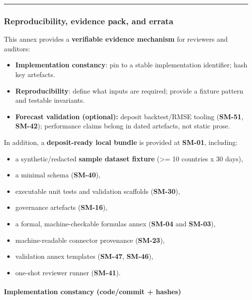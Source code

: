 \documentclass[
  11pt,
  peerreview,journal,onecolumn]{IEEEtran}
\providecommand{\tightlist}{%
  \setlength{\itemsep}{0pt}\setlength{\parskip}{0pt}}
\begin{document}
\begin{center}\rule{0.5\linewidth}{0.5pt}\end{center}

\hypertarget{reproducibility-evidence-pack-and-errata}{%
\subsubsection{Reproducibility, evidence pack, and
errata}\label{reproducibility-evidence-pack-and-errata}}

This annex provides a \textbf{verifiable evidence mechanism} for
reviewers and auditors:

\begin{itemize}
\tightlist
\item
  \textbf{Implementation constancy}: pin to a stable implementation
  identifier; hash key artefacts.
\item
  \textbf{Reproducibility}: define what inputs are required; provide a
  fixture pattern and testable invariants.
\item
  \textbf{Forecast validation (optional):} deposit backtest/RMSE tooling
  (\textbf{SM-51}, \textbf{SM-42}); performance claims belong in dated
  artefacts, not static prose.
\end{itemize}

In addition, a \textbf{deposit-ready local bundle} is provided at
\textbf{SM-01}, including:

\begin{itemize}
\tightlist
\item
  a synthetic/redacted \textbf{sample dataset fixture} (\textgreater= 10
  countries x 30 days),
\item
  a minimal schema (\textbf{SM-40}),
\item
  executable unit tests and validation scaffolds (\textbf{SM-30}),
\item
  governance artefacts (\textbf{SM-16}),
\item
  a formal, machine-checkable formulas annex (\textbf{SM-04} and
  \textbf{SM-03}),
\item
  machine-readable connector provenance (\textbf{SM-23}),
\item
  validation annex templates (\textbf{SM-47}, \textbf{SM-46}),
\item
  one-shot reviewer runner (\textbf{SM-41}).
\end{itemize}

\hypertarget{implementation-constancy-codecommit-hashes}{%
\paragraph{Implementation constancy (code/commit +
hashes)}\label{implementation-constancy-codecommit-hashes}}
\end{document}
